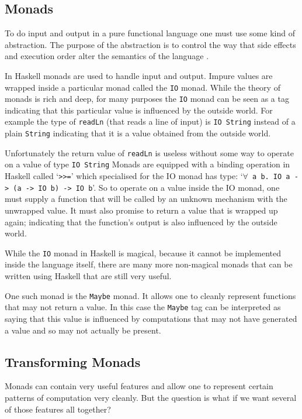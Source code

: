 \documentclass[]{article}
\newcommand{\function}[1]{\texttt{#1}}
\newcommand{\type}[1]{\texttt{#1}}
\begin{document}
\subsection{Monads}

To do input and output in a pure functional language one must use some kind of
abstraction. The purpose of the abstraction is to control the way that side
effects and execution order alter the semantics of the language
\cite{PeytonJones:2001}.

In Haskell monads are used to handle input and output. Impure values are
wrapped inside a particular monad called the \type{IO} monad. While the theory
of monads is rich and deep, for many purposes the \type{IO} monad can be seen
as a tag indicating that this particular value is influenced by the outside
world. For example the type of \function{readLn} (that reads a line of input)
is \type{IO String} instead of a plain \type{String} indicating that it is a
value obtained from the outside world.

Unfortunately the return value of \function{readLn} is useless without some
way to operate on a value of type \type{IO String} Monads are equipped with a
binding operation in Haskell called `\function{>>=}' which specialised for the
IO monad has type: `\type{$\forall$~a~b.~IO~a~->~(a~->~IO~b)~->~IO~b}'. So to
operate on a value inside the IO monad, one must supply a function that will
be called by an unknown mechanism with the unwrapped value. It must also
promise to return a value that is wrapped up again; indicating that the
function's output is also influenced by the outside world.

While the \type{IO} monad in Haskell is magical, because it cannot
be implemented inside the language itself, there are many
more non-magical monads that can be written using Haskell that are
still very useful.

One such monad is the \type{Maybe} monad. It allows one to cleanly represent
functions that may not return a value. In this case the \type{Maybe} tag can
be interpreted as saying that this value is influenced by computations that
may not have generated a value and so may not actually be present.

\subsection{Transforming Monads}
\label{discussion:monadtrans}

Monads can contain very useful features and allow one to represent
certain patterns of computation very cleanly. But the question is
what if we want several of those features all together?
\end{document}
